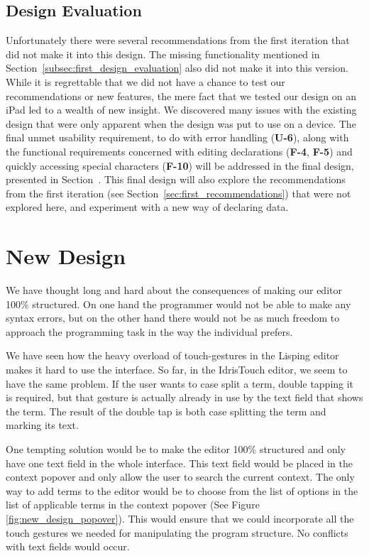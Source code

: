 \subsection{Design Evaluation}
\label{second_design_evaluation}
Unfortunately there were several recommendations from the first iteration that did not make it into this design. 
The missing functionality mentioned in Section~\ref{subsec:first_design_evaluation} also did not make it into this version.
While it is regrettable that we did not have a chance to test our recommendations or new features, the mere fact that we tested our design on an iPad led to a wealth of new insight.
We discovered many issues with the existing design that were only apparent when the design was put to use on a device. 
The final unmet usability requirement, to do with error handling (\textbf{U-6}), along with the functional requirements concerned with editing declarations (\textbf{F-4}, \textbf{F-5}) and quickly accessing special characters (\textbf{F-10}) will be addressed in the final design, presented in Section~. 
This final design will also explore the recommendations from the first iteration (see Section~\ref{sec:first_recommendations}) that were not explored here, and experiment with a new way of declaring data.

\section{New Design}
We have thought long and hard about the consequences of making our editor 100\%
structured. On one hand the programmer would not be able to make any syntax
errors, but on the other hand there would not be as much freedom to approach
the programming task in the way the individual prefers.

We have seen how the heavy overload of touch-gestures in the Lisping editor makes it hard to use
the interface. So far, in the IdrisTouch editor, we seem to have the same
problem. If the user wants to case split a term, double tapping it is required,
but that gesture is actually already in use by the text field that shows the
term. The result of the double tap is both case splitting the term and marking
its text.

One tempting solution would be to make the editor 100\% structured and only
have one text field in the whole interface. This text field would be placed in
the context popover and only allow the user to search the current context. The only way to add terms to the editor would be to choose from the list of options in the list of applicable terms in the context popover (See Figure \ref{fig:new_design_popover}). This
would ensure that we could incorporate all the touch gestures we needed for
manipulating the program structure. No conflicts with text fields would occur.

